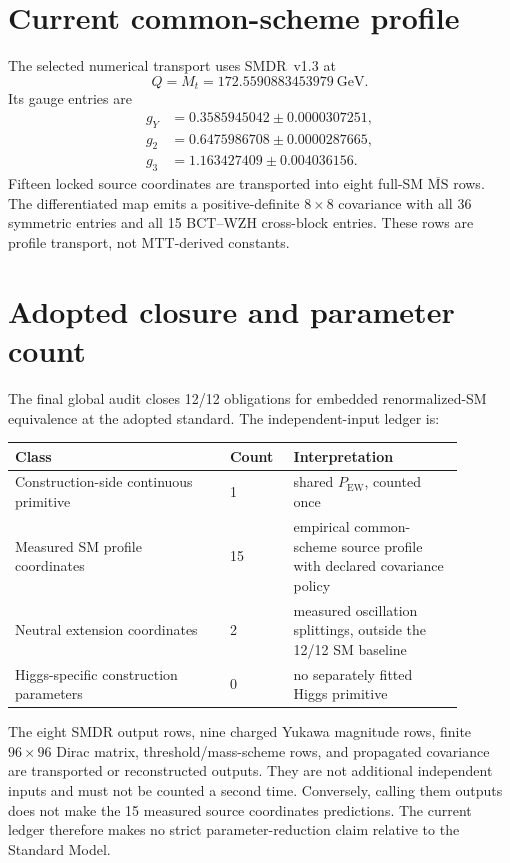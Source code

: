 \documentclass[11pt]{article}
\begin{document}
\section{Current common-scheme profile}

The selected numerical transport uses SMDR~v1.3 at
\[
Q=M_t=172.5590883453979~\mathrm{GeV}.
\]
Its gauge entries are
\[
\begin{aligned}
g_Y&=0.3585945042\pm0.0000307251,\\
g_2&=0.6475986708\pm0.0000287665,\\
g_3&=1.163427409\pm0.004036156.
\end{aligned}
\]
Fifteen locked source coordinates are transported into eight full-SM
$\overline{\mathrm{MS}}$ rows. The differentiated map emits a positive-definite
$8\times8$ covariance with all 36 symmetric entries and all 15 BCT--WZH
cross-block entries. These rows are profile transport, not MTT-derived
constants.

\section{Adopted closure and parameter count}

The final global audit closes 12/12 obligations for embedded renormalized-SM
equivalence at the adopted standard. The independent-input ledger is:
\begin{center}
\begin{tabular}{p{0.43\linewidth}p{0.12\linewidth}p{0.34\linewidth}}
\toprule
Class & Count & Interpretation \\
\midrule
Construction-side continuous primitive & 1 & shared
$P_{\mathrm{EW}}$, counted once \\
Measured SM profile coordinates & 15 & empirical common-scheme source
profile with declared covariance policy \\
Neutral extension coordinates & 2 & measured oscillation splittings, outside
the 12/12 SM baseline \\
Higgs-specific construction parameters & 0 & no separately fitted Higgs
primitive \\
\bottomrule
\end{tabular}
\end{center}

The eight SMDR output rows, nine charged Yukawa magnitude rows, finite
$96\times96$ Dirac matrix, threshold/mass-scheme rows, and propagated
covariance are transported or reconstructed outputs. They are not additional
independent inputs and must not be counted a second time. Conversely, calling
them outputs does not make the 15 measured source coordinates predictions.
The current ledger therefore makes no strict parameter-reduction claim
relative to the Standard Model.
\end{document}
